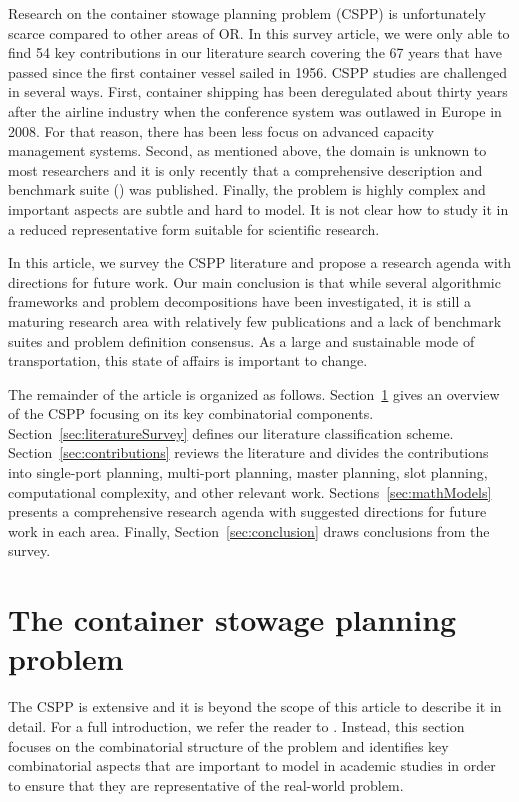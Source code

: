 \documentclass[preprint,12pt,authoryear]{elsarticle}
\begin{document}
Research on the container stowage planning problem (CSPP) is unfortunately scarce compared to other areas of OR. In this survey article, we were only able to find 54 key contributions in our literature search covering the 67 years that have passed since the first container vessel sailed in 1956. CSPP studies are challenged in several ways. First, container shipping has been deregulated about thirty years after the airline industry when the conference system was outlawed in Europe in 2008. For that reason, there has been less focus on advanced capacity management systems. Second, as mentioned above, the domain is unknown to most researchers and it is only recently that a comprehensive description \citep{Jensen2018ContainerPlanning} and benchmark suite (\cite{Larsen2021AProblem}) was published. Finally, the problem is highly complex and important aspects are subtle and hard to model. It is not clear how to study it in a reduced representative form suitable for scientific research.

In this article, we survey the CSPP literature and propose a research agenda with directions for future work. Our main conclusion is that while several algorithmic frameworks and problem decompositions have been investigated, it is still a maturing research area with relatively few publications and a lack of benchmark suites and problem definition consensus. As a large and sustainable mode of transportation, this state of affairs is important to change.   

The remainder of the article is organized as follows. Section~\ref{sec:stowagePlanning} gives an overview of the CSPP focusing on its key combinatorial components. Section~\ref{sec:literatureSurvey} defines our literature classification scheme. Section~\ref{sec:contributions} reviews the literature and divides the contributions into single-port planning, multi-port planning, master planning, slot planning, computational complexity, and other relevant work. Sections~\ref{sec:mathModels} presents a comprehensive research agenda with suggested directions for future work in each area. Finally, Section~\ref{sec:conclusion} draws conclusions from the survey. 

\section{The container stowage planning problem}
\label{sec:stowagePlanning}
The CSPP is extensive and it is beyond the scope of this article to describe it in detail. For a full introduction, we refer the reader to \cite{Jensen2018ContainerPlanning}. Instead, this section focuses on the combinatorial structure of the problem and identifies key combinatorial aspects that are important to model in academic studies in order to ensure that they are representative of the real-world problem.
\end{document}
